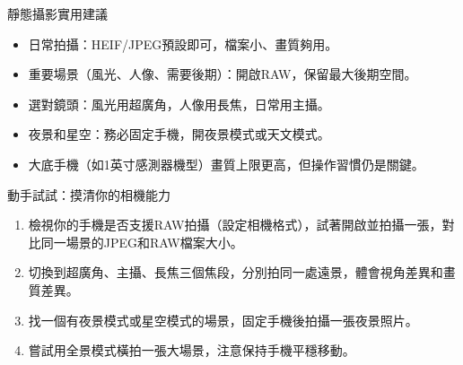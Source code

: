 \begin{tcbinfo}{靜態攝影實用建議}
\begin{itemize}
  \item 日常拍攝：HEIF/JPEG預設即可，檔案小、畫質夠用。
  \item 重要場景（風光、人像、需要後期）：開啟RAW，保留最大後期空間。
  \item 選對鏡頭：風光用超廣角，人像用長焦，日常用主攝。
  \item 夜景和星空：務必固定手機，開夜景模式或天文模式。
  \item 大底手機（如1英寸感測器機型）畫質上限更高，但操作習慣仍是關鍵。
\end{itemize}

\end{tcbinfo}

\begin{tcbpractice}{動手試試：摸清你的相機能力}
\begin{enumerate}
  \item 檢視你的手機是否支援RAW拍攝（設定相機格式），試著開啟並拍攝一張，對比同一場景的JPEG和RAW檔案大小。
  \item 切換到超廣角、主攝、長焦三個焦段，分別拍同一處遠景，體會視角差異和畫質差異。
  \item 找一個有夜景模式或星空模式的場景，固定手機後拍攝一張夜景照片。
  \item 嘗試用全景模式橫拍一張大場景，注意保持手機平穩移動。
\end{enumerate}

\end{tcbpractice}
